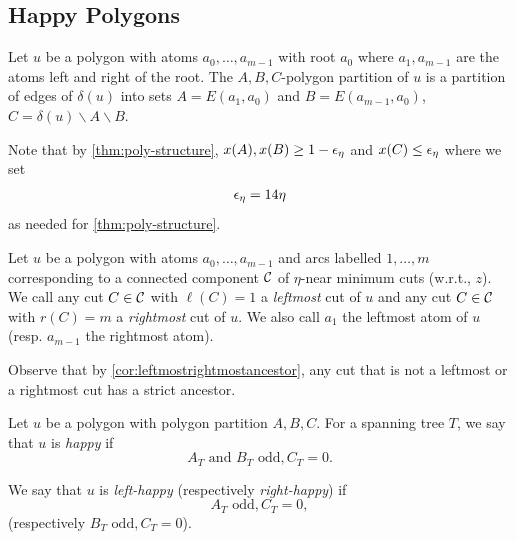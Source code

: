 \subsection{Happy Polygons}
\label{sec:happypolygons}
\begin{definition}\label{def:abcpolygonpartitioning}
Let $u$ be a polygon with atoms $a_0,\dots,a_{m-1}$ with root  $a_0$ where $a_1,a_{m-1}$ are the atoms left and right of the root.
The $A,B,C$-polygon partition of $u$ is a partition of edges of $\delta(u)$ into sets $A=E(a_1,a_0)$ and $B=E(a_{m-1},a_0)$, $C=\delta(u)\smallsetminus A\smallsetminus B$. 
\end{definition}
Note that by \cref{thm:poly-structure}, $x(A),x(B)\geq 1-{\epsilon}_\eta$ and $x(C)\leq {\epsilon}_\eta$ where we set 
\begin{align}\label{def:eps-eta}
	{\epsilon}_\eta= 14\eta
\end{align}
as needed for \cref{thm:poly-structure}.
\begin{definition}
	Let $u$ be a polygon with atoms $a_0,\dots,a_{m-1}$ and arcs labelled $1,\dots,m$ corresponding to a connected component ${\cal C}$ of $\eta$-near minimum cuts (w.r.t., $z$).  We call any cut $C\in {\cal C}$ with $\ell(C)=1$ a {\em leftmost} cut of $u$ and any cut $C\in {\cal C}$ with $r(C)=m$ a {\em rightmost} cut of $u$. 
		We also call $a_1$ the leftmost atom of $u$ (resp.  $a_{m-1}$ the rightmost atom).
\end{definition}
Observe that by \cref{cor:leftmostrightmostancestor}, any cut that is not a leftmost or a rightmost cut has a strict ancestor. 

\begin{definition}
Let $u$ be a polygon with polygon partition $A,B,C$.
For a spanning tree $T$, we say that $u$ is {\em happy} if 
$$A_T \text{ and } B_T \text{ odd}, C_T=0.$$

We say that $u$ is {\em left-happy} (respectively {\em right-happy}) if 
$$A_T \text{ odd}, C_T=0,$$
(respectively $B_T \text{ odd}, C_T=0$).
\end{definition}

